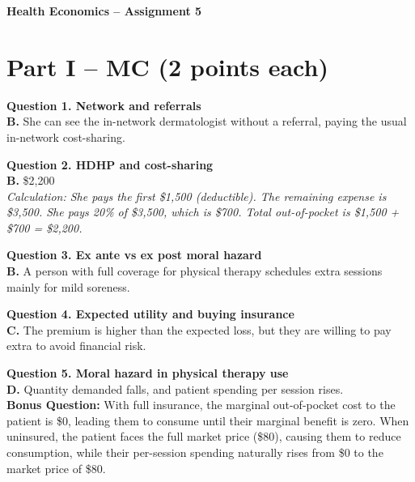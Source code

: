 \documentclass[11pt, letterpaper]{article}
\begin{document}
\begin{center}
    \LARGE\bfseries Health Economics -- Assignment 5
\end{center}
\vspace{1em}

\section*{Part I – MC (2 points each)}

\textbf{Question 1. Network and referrals} \\
\textbf{B.} She can see the in-network dermatologist without a referral, paying the usual in-network cost-sharing.

\vspace{1em}

\textbf{Question 2. HDHP and cost-sharing} \\
\textbf{B.} \$2,200 \\
\textit{Calculation: She pays the first \$1,500 (deductible). The remaining expense is \$3,500. She pays 20\% of \$3,500, which is \$700. Total out-of-pocket is \$1,500 + \$700 = \$2,200.}

\vspace{1em}

\textbf{Question 3. Ex ante vs ex post moral hazard} \\
\textbf{B.} A person with full coverage for physical therapy schedules extra sessions mainly for mild soreness.

\vspace{1em}

\textbf{Question 4. Expected utility and buying insurance} \\
\textbf{C.} The premium is higher than the expected loss, but they are willing to pay extra to avoid financial risk.

\vspace{1em}

\textbf{Question 5. Moral hazard in physical therapy use} \\
\textbf{D.} Quantity demanded falls, and patient spending per session rises. \\
\textbf{Bonus Question:} With full insurance, the marginal out-of-pocket cost to the patient is \$0, leading them to consume until their marginal benefit is zero. When uninsured, the patient faces the full market price (\$80), causing them to reduce consumption, while their per-session spending naturally rises from \$0 to the market price of \$80.
\end{document}
